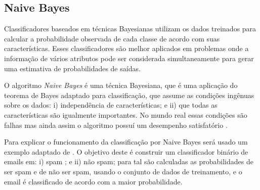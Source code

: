 \subsection{Naive Bayes}
Classificadores baseados em técnicas Bayesianas utilizam os dados treinados para calcular a probabilidade observada de cada classe de acordo com suas características. Esses classificadores são melhor aplicados em problemas onde a informação de vários atributos pode ser considerada simultaneamente para gerar uma estimativa de probabilidades de saídas.

O algoritmo \emph{Naive Bayes} é uma técnica Bayesiana, que é uma aplicação do teorema de Bayes adaptado para classificação, que assume as condições ingênuas sobre os dados: i) independência de características; e ii) que todas as características são igualmente importantes. No mundo real essas condições são falhas mas ainda assim o algoritmo possuí um desempenho satisfatório \cite{HanKamber2011}.

Para explicar o funcionamento da classificação por Naive Bayes será usado um exemplo adaptado de . O objetivo deste é construir um classificador binário de emails em: i) spam ; e ii) não spam; para tal são calculadas as probabilidades de ser spam e de não ser spam, usando o conjunto de dados de treinamento, e o email é classificado de acordo com a maior probabilidade. 

